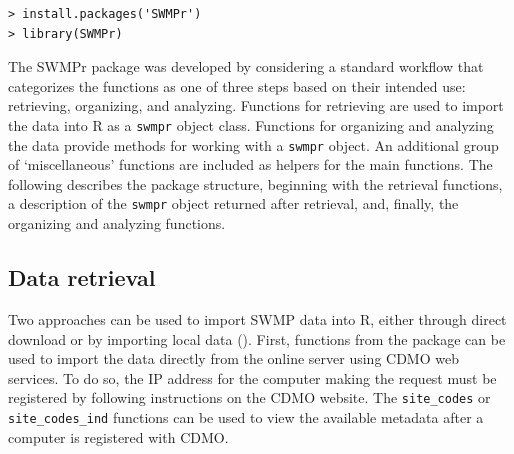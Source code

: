 \documentclass[10pt,letterpaper]{article}\usepackage[]{graphicx}\usepackage[]{color}
\makeatletter
\newenvironment{kframe}{%
 \def\at@end@of@kframe{}%
 \ifinner\ifhmode%
  \def\at@end@of@kframe{\end{minipage}}%
  \begin{minipage}{\columnwidth}%
 \fi\fi%
 \def\FrameCommand##1{\hskip\@totalleftmargin \hskip-\fboxsep
 \colorbox{shadecolor}{##1}\hskip-\fboxsep
     \hskip-\linewidth \hskip-\@totalleftmargin \hskip\columnwidth}%
 \MakeFramed {\advance\hsize-\width
   \@totalleftmargin\z@ \linewidth\hsize
   \@setminipage}}%
 {\par\unskip\endMakeFramed%
 \at@end@of@kframe}
\newenvironment{knitrout}{}{} %
\makeatother
\begin{document}
\begin{knitrout}\small
{}\color{fgcolor}\begin{kframe}
\begin{verbatim}
> install.packages('SWMPr')
> library(SWMPr)
\end{verbatim}
\end{kframe}
\end{knitrout}


The SWMPr package was developed by considering a standard workflow that categorizes the functions as one of three steps based on their intended use: retrieving, organizing, and analyzing.  Functions for retrieving are used to import the data into R as a \texttt{swmpr} object class.  Functions for organizing and analyzing the data provide methods for working with a \texttt{swmpr} object.  An additional group of `miscellaneous' functions are included as helpers for the main functions.  The following describes the package structure, beginning with the retrieval functions, a description of the \texttt{swmpr} object returned after retrieval, and, finally, the organizing and analyzing functions.

\subsection*{Data retrieval}

Two approaches can be used to import \gls{SWMP} data into R, either through direct download or by importing local data (). First, functions from the package can be used to import the data directly from the online server using \gls{CDMO} web services. To do so, the IP address for the computer making the request must be registered by following instructions on the \gls{CDMO} website.  The \texttt{site\_codes} or \texttt{site\_codes\_ind} functions can be used to view the available metadata after a computer is registered with \gls{CDMO}. 
\end{document}
